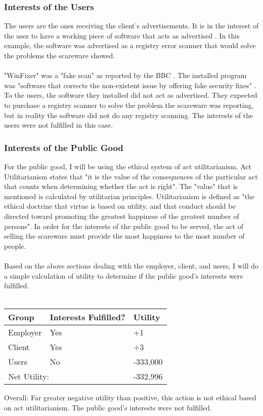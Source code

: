 \documentclass[11pt]{article}
\begin{document}
\begin{multicols}{2}
\subsubsection{Interests of the Users}
The users are the ones receiving the client's advertisements. It is in the interest of the user to have a working piece of software that acts as advertised \cite{bbcmillionstricked}. In this example, the software was advertised as a registry error scanner that would solve the problems the scareware showed\cite{bbcfighting}.\\
\vspace{10pt}\\
"WinFixer" was a "fake scan" as reported by the BBC \cite{bbcfighting}. The installed program was "software that corrects the non-existent issue by offering fake security fixes" \cite{bbcfighting}. To the users, the software they installed did not act as advertised. They expected to purchase a registry scanner to solve the problem the scareware was reporting, but in reality the software did not do any registry scanning\cite{bbcfighting}. The interests of the users were not fulfilled in this case.
\subsubsection{Interests of the Public Good}
For the public good, I will be using the ethical system of act utilitarianism. Act Utilitarianism states that "it is the value of the consequences of the particular act that counts when determining whether the act is right"\cite{actutil}. The "value" that is mentioned is calculated by utilitarian principles. Utilitarianism is defined as "the ethical doctrine that virtue is based on utility,  and that conduct should be directed toward promoting the greatest happiness of the greatest number of persons"\cite{dictionary}. In order for the interests of the public good to be served, the act of selling the scareware must provide the most happiness to the most number of people.\\
\vspace{10pt}\\
Based on the above sections dealing with the employer, client, and users, I will do a simple calculation of utility to determine if the public good's interests were fulfilled. \\
\vspace{10pt} \\
\begin{tabular}{l l l}
Group & Interests Fulfilled? & Utility \\ \hline
Employer & Yes & +1 \\
Client & Yes & +3 \\
Users & No & -333,000 \\ \hline
\multicolumn{2}{l}{Net Utility:} & -332,996
\end{tabular}
\item Overall: Far greater negative utility than positive, this action is not ethical based on act utilitarianism. The public good's interests were not fulfilled.

\end{multicols}
\end{document}
